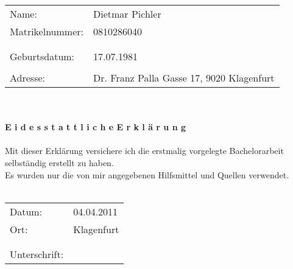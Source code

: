 \begin{titlepage}
\hspace{-1cm}\begin{tabular}{p{5cm} l}
Name: & Dietmar Pichler\\
Matrikelnummer: & 0810286040\\
& \\
& \\
Geburtsdatum: & 17.07.1981\\
& \\
Adresse: & Dr. Franz Palla Gasse 17, 9020 Klagenfurt\\
%
\end{tabular}\\
\vspace{3.5cm}\\
\Large{\textbf{E i d e s s t a t t l i c h e \hspace{0.3cm} E r k l ä r u n g}}\\
\vspace{5cm}\\ \normalsize
Mit dieser Erklärung versichere ich die erstmalig vorgelegte Bachelorarbeit selbständig erstellt zu haben.\\
Es wurden nur die von mir angegebenen Hilfsmittel und Quellen verwendet.\\
\vspace{3cm}\\
\begin{tabular}{p{5cm} l}
Datum: & 04.04.2011\\
Ort: & Klagenfurt\\
& \\
& \\
Unterschrift: & \\
%
\end{tabular}
\end{titlepage} 